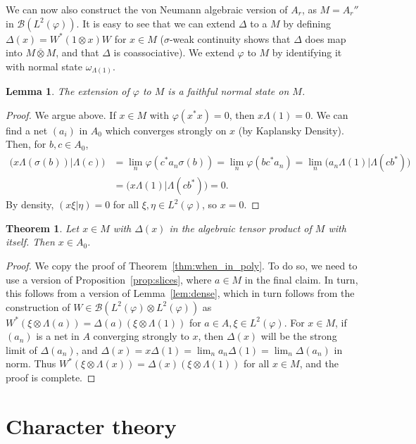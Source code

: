 \documentclass[twoside,a4paper,12pt]{article}
\theoremstyle{plain}
\newtheorem{theorem}[proposition]{Theorem}
\newtheorem{lemma}[proposition]{Lemma}
\theoremstyle{definition}
\newcommand{\mc}{\mathcal}
\newcommand{\vnten}{\overline\otimes}
\begin{document}
We can now also construct the von Neumann algebraic version of $A_r$,
as $M = A_r''$ in $\mc B(L^2(\varphi))$.  It is easy to see that we can
extend $\Delta$ to a $M$ by defining $\Delta(x)=W^*(1\otimes x)W$ for $x\in M$
($\sigma$-weak continuity shows that $\Delta$ does map into $M\vnten M$,
and that $\Delta$ is coassociative).  We extend $\varphi$ to $M$ by identifying
it with normal state $\omega_{\Lambda(1)}$.

\begin{lemma}
The extension of $\varphi$ to $M$ is a faithful normal state on $M$.
\end{lemma}
\begin{proof}
We argue above.  If $x\in M$ with $\varphi(x^*x)=0$, then $x\Lambda(1)=0$.
We can find a net $(a_i)$ in $A_0$ which converges strongly on $x$ (by
Kaplansky Density).  Then, for $b,c\in A_0$,
\begin{align*} \big( x\Lambda(\sigma(b)) \big| \Lambda(c) \big)
&= \lim_n \varphi( c^* a_n \sigma(b) )
= \lim_n \varphi( bc^* a_n )
= \lim_n \big( a_n \Lambda(1) \Big| \Lambda(cb^*) \big) \\
&= \big( x \Lambda(1) \Big| \Lambda(cb^*) \big) = 0. \end{align*}
By density, $(x\xi|\eta)=0$ for all $\xi,\eta\in L^2(\varphi)$, so $x=0$.
\end{proof}

\begin{theorem}
Let $x\in M$ with $\Delta(x)$ in the algebraic tensor product of
$M$ with itself.  Then $x\in A_0$.
\end{theorem}
\begin{proof}
We copy the proof of Theorem~\ref{thm:when_in_poly}.
To do so, we need to use a version of Proposition~\ref{prop:slices},
where $a\in M$ in the final claim.  In turn, this follows from a version
of Lemma~\ref{lem:dense}, which in turn follows from the construction of
$W\in\mc B(L^2(\varphi)\otimes L^2(\varphi))$ as $W^*(\xi\otimes \Lambda(a))
= \Delta(a)(\xi\otimes\Lambda(1))$ for $a\in A, \xi\in L^2(\varphi)$.
For $x\in M$, if $(a_n)$ is a net in $A$ converging strongly to $x$,
then $\Delta(x)$ will be the strong limit of $\Delta(a_n)$, and
$\Delta(x) = x\Delta(1)=\lim_n a_n\Delta(1)=\lim_n \Delta(a_n)$ in norm.
Thus $W^*(\xi\otimes \Lambda(x)) = \Delta(x)(\xi\otimes\Lambda(1))$ for all
$x\in M$, and the proof is complete.
\end{proof}




\section{Character theory}
\end{document}
